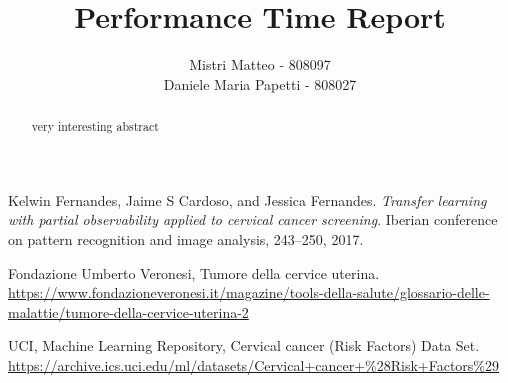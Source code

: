 \documentclass[a4paper, 12pt, conference]{ieeeconf}
\title{\LARGE \bf
Performance Time Report
}
\author{Mistri Matteo - 808097\\
	Daniele Maria Papetti - 808027
}
\begin{document}
\maketitle
\thispagestyle{empty}
\pagestyle{empty}

\begin{abstract}

very interesting abstract
\end{abstract}










\addtolength{\textheight}{-12cm}




\begin{thebibliography}{99}

Kelwin Fernandes, Jaime S Cardoso, and Jessica Fernandes.
\textit{Transfer learning with partial observability applied to cervical cancer screening}.
Iberian conference on pattern recognition and image analysis, 243--250, 2017.

Fondazione Umberto Veronesi, Tumore della cervice uterina.
\url{https://www.fondazioneveronesi.it/magazine/tools-della-salute/glossario-delle-malattie/tumore-della-cervice-uterina-2}

UCI, Machine Learning Repository, Cervical cancer (Risk Factors) Data Set.
\url{https://archive.ics.uci.edu/ml/datasets/Cervical+cancer+\%28Risk+Factors\%29}


\end{thebibliography}
\end{document}
